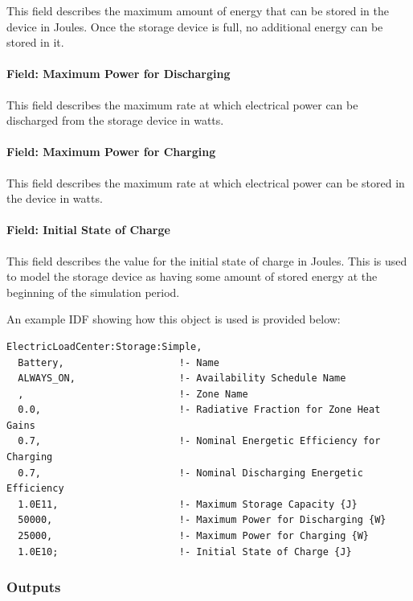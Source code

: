 This field describes the maximum amount of energy that can be stored in the device in Joules. Once the storage device is full, no additional energy can be stored in it.

\paragraph{Field: Maximum Power for Discharging}\label{field-maximum-power-for-discharging}

This field describes the maximum rate at which electrical power can be discharged from the storage device in watts.

\paragraph{Field: Maximum Power for Charging}\label{field-maximum-power-for-charging}

This field describes the maximum rate at which electrical power can be stored in the device in watts.

\paragraph{Field: Initial State of Charge}\label{field-initial-state-of-charge}

This field describes the value for the initial state of charge in Joules. This is used to model the storage device as having some amount of stored energy at the beginning of the simulation period.

An example IDF showing how this object is used is provided below:

\begin{lstlisting}
ElectricLoadCenter:Storage:Simple,
  Battery,                    !- Name
  ALWAYS_ON,                  !- Availability Schedule Name
  ,                           !- Zone Name
  0.0,                        !- Radiative Fraction for Zone Heat Gains
  0.7,                        !- Nominal Energetic Efficiency for Charging
  0.7,                        !- Nominal Discharging Energetic Efficiency
  1.0E11,                     !- Maximum Storage Capacity {J}
  50000,                      !- Maximum Power for Discharging {W}
  25000,                      !- Maximum Power for Charging {W}
  1.0E10;                     !- Initial State of Charge {J}
\end{lstlisting}

\subsubsection{Outputs}\label{outputs-4-003}

